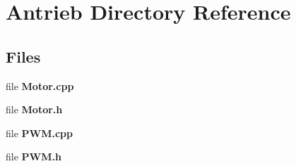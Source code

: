\section{Antrieb Directory Reference}
\label{dir_37d633842842680c6eaf4a433689a6de}
\subsection*{Files}
\begin{DoxyCompactItemize}
\item 
file {\bfseries Motor.\+cpp}
\item 
file {\bfseries Motor.\+h}
\item 
file {\bfseries P\+W\+M.\+cpp}
\item 
file {\bfseries P\+W\+M.\+h}
\end{DoxyCompactItemize}

